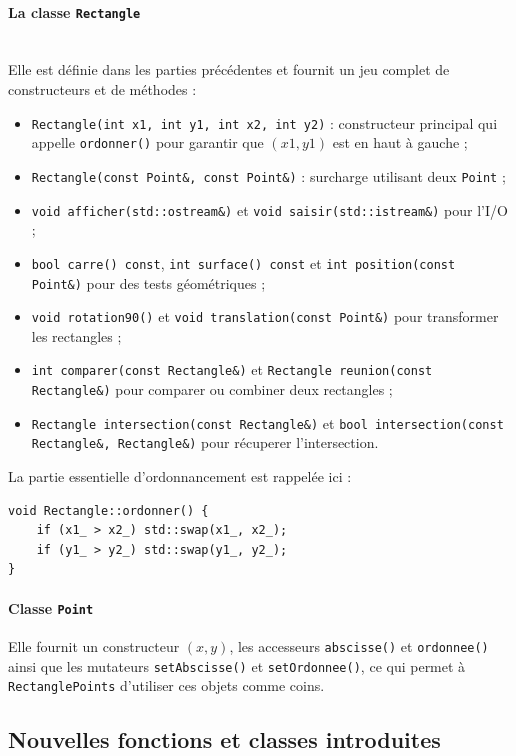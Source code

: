 \documentclass[12pt,a4paper]{article}
\begin{document}
\paragraph{La classe \texttt{Rectangle}}\mbox{}\\
Elle est d\'efinie dans les parties pr\'ec\'edentes et fournit un jeu complet de constructeurs et de m\'ethodes :
\begin{itemize}[leftmargin=*]
    \item \texttt{Rectangle(int x1, int y1, int x2, int y2)} : constructeur principal qui appelle \texttt{ordonner()} pour garantir que $(x1,y1)$ est en haut \`a gauche ;
    \item \texttt{Rectangle(const Point\&, const Point\&)} : surcharge utilisant deux \texttt{Point} ;
    \item \texttt{void afficher(std::ostream\&)} et \texttt{void saisir(std::istream\&)} pour l'I/O ;
    \item \texttt{bool carre() const}, \texttt{int surface() const} et \texttt{int position(const Point\&)} pour des tests g\'eom\'etriques ;
    \item \texttt{void rotation90()} et \texttt{void translation(const Point\&)} pour transformer les rectangles ;
    \item \texttt{int comparer(const Rectangle\&)} et \texttt{Rectangle reunion(const Rectangle\&)} pour comparer ou combiner deux rectangles ;
    \item \texttt{Rectangle intersection(const Rectangle\&)} et \texttt{bool intersection(const Rectangle\&, Rectangle\&)} pour r\'ecuperer l'intersection.
\end{itemize}

La partie essentielle d'ordonnancement est rappel\'ee ici :
\begin{lstlisting}[style=cppstyle]
void Rectangle::ordonner() {
    if (x1_ > x2_) std::swap(x1_, x2_);
    if (y1_ > y2_) std::swap(y1_, y2_);
}
\end{lstlisting}

\paragraph{Classe \texttt{Point}} Elle fournit un constructeur $(x, y)$, les accesseurs \texttt{abscisse()} et \texttt{ordonnee()} ainsi que les mutateurs \texttt{setAbscisse()} et \texttt{setOrdonnee()}, ce qui permet \`a \texttt{RectanglePoints} d'utiliser ces objets comme coins.

\subsection{Nouvelles fonctions et classes introduites}
\end{document}
